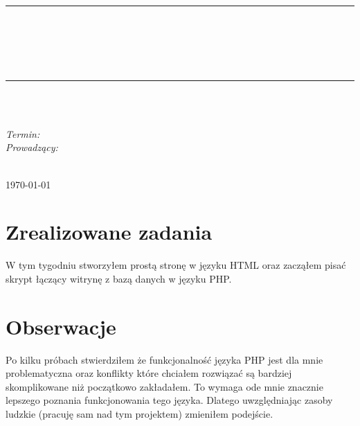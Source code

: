 \documentclass[10pt, a4paper]{article}
\begin{document}
\def\tablename{Tabela}	%

\begin{titlepage}
	\begin{center}
		\textsc{\LARGE \formakursu}\\[1cm]		
		\textsc{\Large \kurs}\\[0.5cm]		
		\rule{\textwidth}{0.08cm}\\[0.4cm]
		{\huge \bfseries \doctype}\\[1cm]
		{\huge \bfseries \projectname}\\[0.5cm]
		{\huge \bfseries \acronim}\\[0.4cm]
		\rule{\textwidth}{0.08cm}\\[1cm]
		
		\begin{flushright} \large
		\osobaA\\[0.4cm]

		
		\emph{Termin: }\termin\\[0.4cm]

		\emph{Prowadzący:} \\
		\prowadzacy \\
		
		\end{flushright}
		
		\vfill
		
		{\large \today}
	\end{center}	
\end{titlepage}


\section{Zrealizowane zadania}
\label{sec:OpisProjektu}

W tym tygodniu stworzyłem prostą stronę w języku HTML oraz zacząłem pisać skrypt łączący witrynę z bazą danych w języku PHP. 

\section{Obserwacje}
Po kilku próbach stwierdziłem że funkcjonalność języka PHP jest dla mnie problematyczna oraz konflikty które chciałem rozwiązać są bardziej skomplikowane niż początkowo zakładałem. To wymaga ode mnie znacznie lepszego poznania funkcjonowania tego języka. Dlatego uwzględniając zasoby ludzkie (pracuję sam nad tym projektem) zmieniłem podejście.
\end{document}
